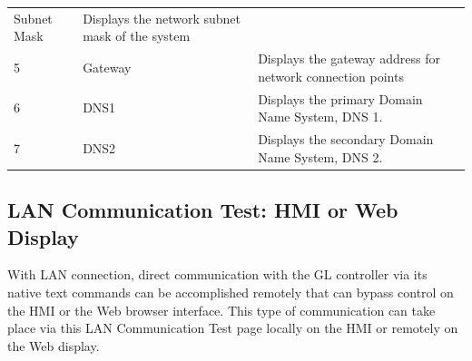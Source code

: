 \begin{longtable}[]{@{}lll@{}}
\begin{minipage}[t]{0.24\columnwidth}
Subnet Mask\strut
\end{minipage} & \begin{minipage}[t]{0.55\columnwidth}\raggedright
Displays the network subnet mask of the system\strut
\end{minipage}\tabularnewline
\begin{minipage}[t]{0.12\columnwidth}\raggedright
5\strut
\end{minipage} & \begin{minipage}[t]{0.24\columnwidth}\raggedright
Gateway\strut
\end{minipage} & \begin{minipage}[t]{0.55\columnwidth}\raggedright
Displays the gateway address for network connection points\strut
\end{minipage}\tabularnewline
\begin{minipage}[t]{0.12\columnwidth}\raggedright
6\strut
\end{minipage} & \begin{minipage}[t]{0.24\columnwidth}\raggedright
DNS1\strut
\end{minipage} & \begin{minipage}[t]{0.55\columnwidth}\raggedright
Displays the primary Domain Name System, DNS 1.\strut
\end{minipage}\tabularnewline
\begin{minipage}[t]{0.12\columnwidth}\raggedright
7\strut
\end{minipage} & \begin{minipage}[t]{0.24\columnwidth}\raggedright
DNS2\strut
\end{minipage} & \begin{minipage}[t]{0.55\columnwidth}\raggedright
Displays the secondary Domain Name System, DNS 2.\strut
\end{minipage}\tabularnewline
\bottomrule
\end{longtable}


\subsection{LAN Communication Test: HMI or Web
Display}

With LAN connection, direct communication with the GL controller via its
native text commands can be accomplished remotely that can bypass
control on the HMI or the Web browser interface. This type of
communication can take place via this LAN Communication Test page
locally on the HMI or remotely on the Web display.


